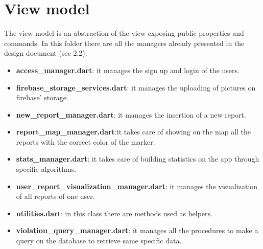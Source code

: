 \documentclass[../ITD.tex]{subfiles}
\begin{document}
    \section{View model}\label{sec:view-model}
    The view model is an abstraction of the view exposing public properties and commands.
    In this folder there are all the managers already presented in the design document (sec 2.2).
    \begin{itemize}
        \item \textbf{access\_manager.dart}: it manages the sign up and login of the users.
        \item \textbf{firebase\_storage\_services.dart}: it manages the uploading of pictures on firebase' storage.
        \item \textbf{new\_report\_manager.dart}: it manages the insertion of a new report.
        \item \textbf{report\_map\_manager.dart}:it takes care of showing on the map all the reports with the correct color of the marker.
        \item \textbf{stats\_manager.dart}: it takes care of building statistics on the app through specific algorithms.
        \item \textbf{user\_report\_visualization\_manager.dart}: it manages the visualization of all reports of one user.
        \item \textbf{utilities.dart}: in this class there are methods used as helpers.
        \item \textbf{violation\_query\_manager.dart}: it manages all the procedures to make a query on the database to retrieve same specific data.
    \end{itemize}
\end{document}

